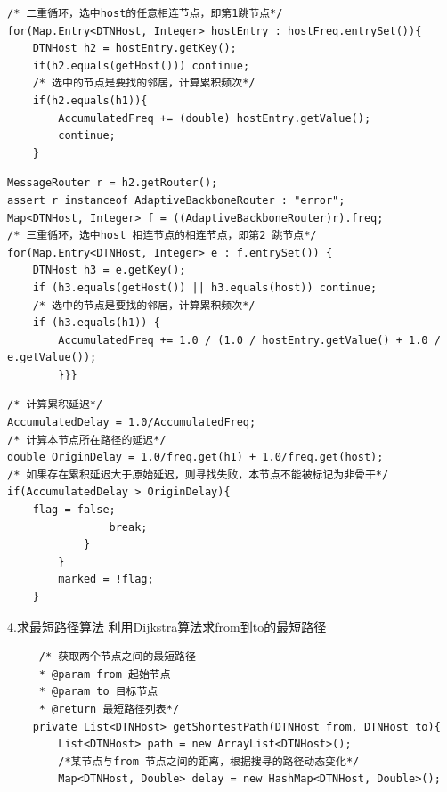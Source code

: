 \documentclass[12pt,aspectratio=43,table]{beamer}
\begin{document}
\begin{frame}[fragile]
\begin{lstlisting}
/* 二重循环，选中host的任意相连节点，即第1跳节点*/
for(Map.Entry<DTNHost, Integer> hostEntry : hostFreq.entrySet()){
    DTNHost h2 = hostEntry.getKey();
    if(h2.equals(getHost())) continue;
    /* 选中的节点是要找的邻居，计算累积频次*/
    if(h2.equals(h1)){
        AccumulatedFreq += (double) hostEntry.getValue();
        continue;
    }
\end{lstlisting}
\end{frame}

\begin{frame}[fragile]
\begin{lstlisting}
MessageRouter r = h2.getRouter();
assert r instanceof AdaptiveBackboneRouter : "error";
Map<DTNHost, Integer> f = ((AdaptiveBackboneRouter)r).freq;
/* 三重循环，选中host 相连节点的相连节点，即第2 跳节点*/
for(Map.Entry<DTNHost, Integer> e : f.entrySet()) {
    DTNHost h3 = e.getKey();
    if (h3.equals(getHost()) || h3.equals(host)) continue;
    /* 选中的节点是要找的邻居，计算累积频次*/
    if (h3.equals(h1)) {
        AccumulatedFreq += 1.0 / (1.0 / hostEntry.getValue() + 1.0 / e.getValue());
        }}}
\end{lstlisting}
\end{frame}

\begin{frame}[fragile]
\begin{lstlisting}
/* 计算累积延迟*/
AccumulatedDelay = 1.0/AccumulatedFreq;
/* 计算本节点所在路径的延迟*/
double OriginDelay = 1.0/freq.get(h1) + 1.0/freq.get(host);
/* 如果存在累积延迟大于原始延迟，则寻找失败，本节点不能被标记为非骨干*/
if(AccumulatedDelay > OriginDelay){
    flag = false;
                break;
            }
        }
        marked = !flag;
    }
\end{lstlisting}
\end{frame}











\begin{frame}[fragile]{\small4.求最短路径算法}
利用Dijkstra算法求from到to的最短路径
\begin{lstlisting}
     /* 获取两个节点之间的最短路径
     * @param from 起始节点
     * @param to 目标节点
     * @return 最短路径列表*/
    private List<DTNHost> getShortestPath(DTNHost from, DTNHost to){
        List<DTNHost> path = new ArrayList<DTNHost>();
        /*某节点与from 节点之间的距离，根据搜寻的路径动态变化*/
        Map<DTNHost, Double> delay = new HashMap<DTNHost, Double>();
\end{lstlisting}
\end{frame}
\end{document}
